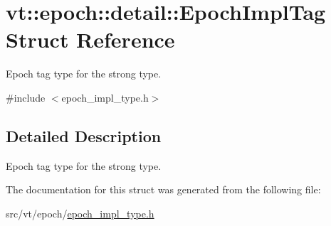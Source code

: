 \hypertarget{structvt_1_1epoch_1_1detail_1_1_epoch_impl_tag}{}\section{vt\+:\+:epoch\+:\+:detail\+:\+:Epoch\+Impl\+Tag Struct Reference}
\label{structvt_1_1epoch_1_1detail_1_1_epoch_impl_tag}


Epoch tag type for the strong type.  




{\ttfamily \#include $<$epoch\+\_\+impl\+\_\+type.\+h$>$}



\subsection{Detailed Description}
Epoch tag type for the strong type. 

The documentation for this struct was generated from the following file\+:\begin{DoxyCompactItemize}
\item 
src/vt/epoch/\hyperlink{epoch__impl__type_8h}{epoch\+\_\+impl\+\_\+type.\+h}\end{DoxyCompactItemize}
